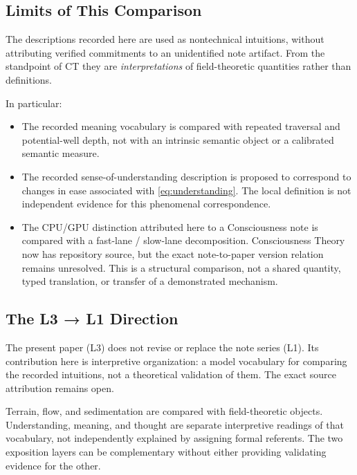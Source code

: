 \subsection{Limits of This Comparison}

The descriptions recorded here are used as nontechnical intuitions,
without attributing verified commitments to an unidentified note artifact.
From the standpoint of CT they are \emph{interpretations} of
field-theoretic quantities rather than definitions.

In particular:
\begin{itemize}
  \item The recorded meaning vocabulary is compared with repeated
        traversal and potential-well depth, not with an intrinsic semantic
        object or a calibrated semantic measure.
  \item The recorded sense-of-understanding description is proposed
        to correspond to changes in ease associated with
        \eqref{eq:understanding}. The local definition is not independent
        evidence for this phenomenal correspondence.
  \item The CPU/GPU distinction attributed here to a Consciousness
        note is compared with a fast-lane / slow-lane decomposition.
        Consciousness Theory now has repository source, but the exact
        note-to-paper version relation remains unresolved. This is a
        structural comparison, not a shared quantity, typed translation,
        or transfer of a demonstrated mechanism.
\end{itemize}

\subsection{The L3 → L1 Direction}

The present paper (L3) does not revise or replace the note series (L1).
Its contribution here is interpretive organization: a model vocabulary
for comparing the recorded intuitions, not a theoretical validation of them.
The exact source attribution remains open.

Terrain, flow, and sedimentation are compared with field-theoretic
objects. Understanding, meaning, and thought are separate interpretive
readings of that vocabulary, not independently explained by assigning
formal referents. The two exposition layers can be complementary
without either providing validating evidence for the other.
